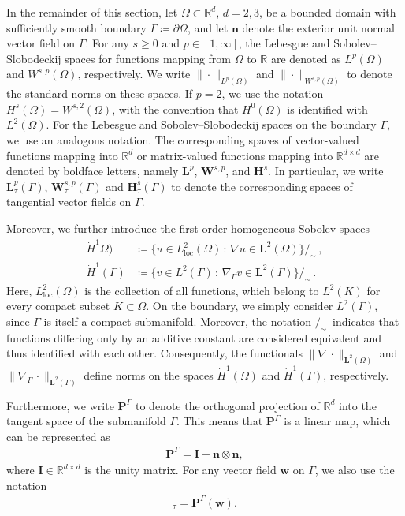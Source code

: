 \documentclass[10pt,reqno]{amsart}
\theoremstyle{remark}
\numberwithin{equation}{section}
\newcommand{\norm}[1]{\| #1 \|}
\newcommand{\R}{\mathbb R}
\newcommand{\n}{\mathbf{n}}
\newcommand{\bw}{\mathbf{w}}
\newcommand{\Grad}{\nabla}
\newcommand{\Gradg}{\nabla_\Ga}
\newcommand{\Om}{\Omega}
\newcommand{\Ga}{\Gamma}
\begin{document}
In the remainder of this section, let $\Om\subset\R^d$, $d=2,3$, be a bounded domain with sufficiently smooth boundary $\Ga\coloneqq\partial\Om$, and let $\n$ denote the exterior unit normal vector field on $\Gamma$. For any $s\geq 0$ and $p\in[1,\infty]$, the Lebesgue and Sobolev--Slobodeckij spaces for functions mapping from $\Om$ to $\R$ are denoted as $L^p(\Om)$ and $W^{s,p}(\Om)$, respectively. We write $\norm{\cdot}_{L^p(\Om)}$ and $\norm{\cdot}_{W^{s,p}(\Om)}$ to denote the standard norms on these spaces. If $p = 2$, we use the notation $H^s(\Om) = W^{s,2}(\Om)$, with the convention that $H^0(\Om)$ is identified with $L^2(\Om)$. For the Lebesgue and Sobolev--Slobodeckij spaces on the boundary $\Ga$, we use an analogous notation. The corresponding spaces of vector-valued functions mapping into $\R^d$ or matrix-valued functions mapping into $\R^{d\times d}$ are denoted by boldface letters, namely $\mathbf L^p$, $\mathbf W^{s,p}$, and $\mathbf H^s$. In particular, we write $\mathbf L^p_\tau(\Gamma)$, $\mathbf W^{s,p}_\tau(\Gamma)$ and $\mathbf H^s_\tau(\Gamma)$ to denote the corresponding spaces of tangential vector fields on $\Gamma$.

Moreover, we further introduce the first-order homogeneous Sobolev spaces
\begin{align*}
    \dot H^1\Omega) 
    &\coloneqq
    \big\{ u \in L^2_\mathrm{loc}(\Omega) 
    \,:\, \Grad u \in \mathbf L^2(\Omega) \big\}\big/_{\sim} \,,
    \\
    \dot H^1(\Gamma) 
    &\coloneqq
    \big\{ v \in L^2(\Gamma) 
    \,:\, \Gradg v \in \mathbf L^2(\Gamma) \big\}\big/_{\sim} \,.
\end{align*}
Here, $L^2_\mathrm{loc}(\Omega)$ is the collection of all functions, which belong to $L^2(K)$ for every compact subset $K\subset \Omega$. On the boundary, we simply consider $L^2(\Gamma)$, since $\Gamma$ is itself a compact submanifold.
Moreover, the notation $/_{\sim}\,$ indicates that functions differing only by an additive constant are considered equivalent and thus identified with each other. Consequently, the functionals ${\norm{\Grad\,\cdot}_{\mathbf L^2(\Omega)}}$ and ${\norm{\Gradg\,\cdot}_{\mathbf L^2(\Gamma)}}$ define norms on the spaces $\dot H^1(\Omega)$ and $\dot H^1(\Gamma)$, respectively.

Furthermore, we write $\mathbf{P}^\Gamma$ to denote the orthogonal projection of $\R^d$ into the tangent space of the submanifold $\Gamma$.
This means that $\mathbf{P}^\Gamma$ is a linear map, which can be represented as
\begin{align*}
    \mathbf{P}^\Gamma = \mathbf{I} - \n\otimes\n,
\end{align*}
where $\mathbf{I}\in\R^{d\times d}$ is the unity matrix.
For any vector field $\bw$ on $\Gamma$, we also use the notation
\begin{align*}
    [\bw]_\tau = \mathbf{P}^\Gamma(\bw).
\end{align*}
\end{document}
